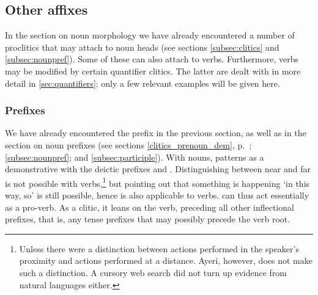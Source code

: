 


\subsection{Other affixes}

In the section on noun morphology we have already encountered a number of
proclitics that may attach to noun heads (see sections
\ref{subsec:clitics} and \ref{subsec:nounpref}). Some of these can also attach
to verbs. Furthermore, verbs may be modified by certain quantifier clitics. The
latter are dealt with in more detail in \autoref{sec:quantifiers}; only a few
relevant examples will be given here.

\subsubsection{Prefixes}
\label{subsubsec:verbprefixes}

We have already encountered the prefix  in the
previous section, as well as in the section on noun prefixes (see sections
\ref{clitics_prenoun_dem}, p.~\pageref{clitics_prenoun_dem}; 
\ref{subsec:nounpref}; and \ref{subsec:participle}). With nouns,
 patterns as a demonstrative with the deictic prefixes
 and . Distinguishing between near
and far is not possible with verbs,\footnote{Unless there were a distinction
between actions performed in the speaker's proximity and actions performed at a
distance. Ayeri, however, does not make such a distinction. A cursory web
search did not turn up evidence from natural languages either.} but pointing
out that something is happening `in this way, so' is still possible, hence
 is also applicable to verbs.  can thus act
essentially as a pro-verb. As a clitic, it leans on the verb, preceding all
other inflectional prefixes, that is, any tense prefixes that may possibly
precede the verb root.

